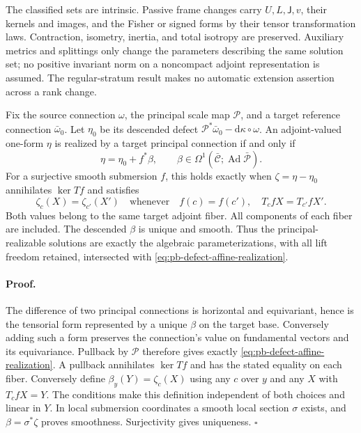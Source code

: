 The classified sets are intrinsic. Passive frame changes carry
$U,L,\mathsf J,v$, their kernels and images, and the Fisher or signed
forms by their tensor transformation laws. Contraction, isometry,
inertia, and total isotropy are preserved. Auxiliary metrics and
splittings only change the parameters describing the same solution
set; no positive invariant norm on a noncompact adjoint
representation is assumed. The regular-stratum result makes no
automatic extension assertion across a rank change.

Fix the source connection $\omega$, the principal scale map
$\mathcal P$, and a target reference connection $\bar\omega_0$.
Let $\eta_0$ be its descended defect
$\mathcal P^*\bar\omega_0-\mathrm d\kappa\circ\omega$.
An adjoint-valued one-form $\eta$ is realized by a target principal
connection if and only if
\begin{equation}
\eta=\eta_0+f^*\beta,\qquad
\beta\in\Omega^1(\bar{\mathcal C};
                 \operatorname{Ad}\bar{\mathscr P}).
\label{eq:pb-defect-affine-realization}
\end{equation}
For a surjective smooth submersion $f$, this holds exactly when
$\zeta=\eta-\eta_0$ annihilates $\ker Tf$ and satisfies
\begin{equation}
\zeta_c(X)=\zeta_{c'}(X')
\quad\text{whenever}\quad
f(c)=f(c'),\quad T_cfX=T_{c'}fX'.
\label{eq:pb-defect-all-fiber-descent}
\end{equation}
Both values belong to the same target adjoint fiber. All components
of each fiber are included. The descended $\beta$ is unique and
smooth. Thus the principal-realizable solutions are exactly the
algebraic parameterizations, with all lift freedom retained,
intersected with \eqref{eq:pb-defect-affine-realization}.

\paragraph{Proof.}
The difference of two principal connections is horizontal and
equivariant, hence is the tensorial form represented by a unique
$\beta$ on the target base. Conversely adding such a form preserves
the connection's value on fundamental vectors and its equivariance.
Pullback by $\mathcal P$ therefore gives exactly
\eqref{eq:pb-defect-affine-realization}.
A pullback annihilates $\ker Tf$ and has the stated equality on each
fiber. Conversely define $\beta_y(Y)=\zeta_c(X)$ using any $c$ over $y$
and any $X$ with $T_cfX=Y$. The conditions make this definition
independent of both choices and linear in $Y$. In local submersion
coordinates a smooth local section $\sigma$ exists, and
$\beta=\sigma^*\zeta$ proves smoothness. Surjectivity gives uniqueness.
$\square$

